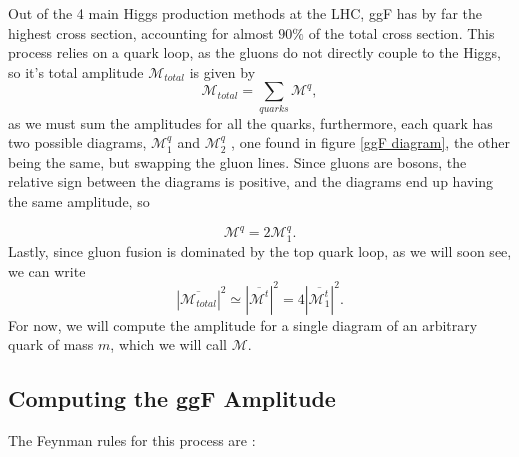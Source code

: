 \documentclass[EPJ,twocolumn]{webofc}
\begin{document}
Out of the 4 main Higgs production methods at the LHC, ggF has by far the highest cross section, accounting for almost $90\%$ of the total cross section. This process relies on a quark loop, as the gluons do not directly couple to the Higgs, so it's total amplitude $\mathcal{M}_{total}$  is given by
\begin{equation}
    \mathcal{M}_{total} =  \sum_{quarks} \mathcal{M}^q,
\end{equation}
as  we must sum the amplitudes for all the quarks, furthermore, each quark has two possible diagrams, $\mathcal{M}_1^q$ and $\mathcal{M}_2^q$ , one found in figure \ref{ggF diagram},  the other being the same, but swapping the gluon lines. Since gluons are bosons, the relative sign between the diagrams is positive, and the diagrams end up having the same amplitude, so

\begin{equation}
    \mathcal{M}^q = 2 \mathcal{M}^q_1.
\end{equation}
Lastly, since gluon fusion is dominated by the top quark loop, as we will soon see, we can write
\begin{equation}
    |\overline{\mathcal{M}_{total}}|^2 \simeq |\overline{\mathcal{M}^t}|^2= 4|\overline{\mathcal{M}_1^t}|^2.
\end{equation}
For now, we will compute the amplitude for a single diagram of an arbitrary quark of mass $m$, which we will call $\mathcal{M}$.


\subsection{Computing the ggF Amplitude}

The Feynman rules for this process are :
\end{document}
